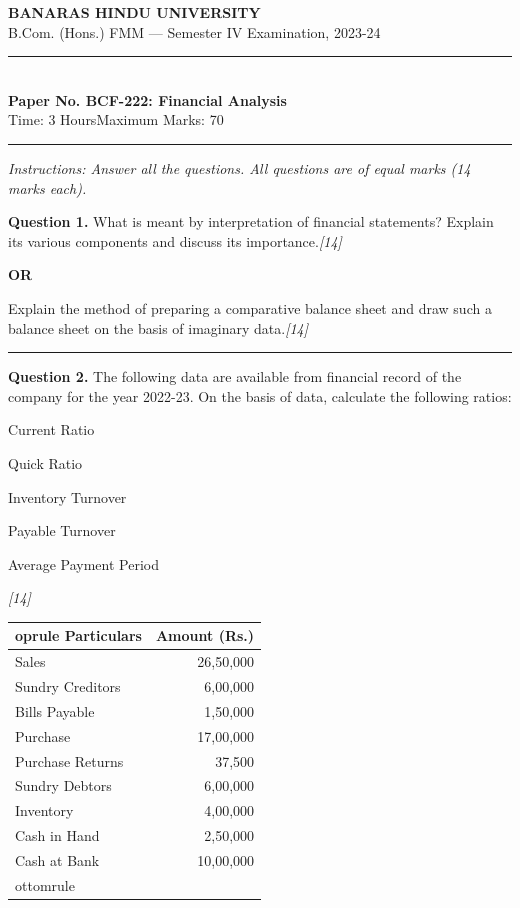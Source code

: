 \documentclass[11pt,a4paper]{article}
\newcommand{\pts}[1]{\hfill   \textit{[#1]}}
\begin{document}
\begin{center}
  {\large\bfseries BANARAS HINDU UNIVERSITY}\\[2pt]
  {\normalsize B.Com. (Hons.) FMM --- Semester IV Examination, 2023-24}\\[6pt]
  \rule{0.8\linewidth}{0.5pt}\\[6pt]
  {\large\bfseries Paper No. BCF-222: Financial Analysis}\\[4pt]
  {\normalsize Time: 3 Hours\hfill Maximum Marks: 70}
\end{center}

\rule{\linewidth}{0.4pt}

\smallskip



\noindent   \textit{Instructions: Answer all the questions. All questions are of equal marks (14 marks each).}

\bigskip




\noindent   \textbf{Question 1.}
What is meant by interpretation of financial statements? Explain its various components and discuss its importance.\pts{14}

\centerline{   \textbf{OR}}

Explain the method of preparing a comparative balance sheet and draw such a balance sheet on the basis of imaginary data.\pts{14}

\medskip\rule{\linewidth}{0.2pt}




\noindent   \textbf{Question 2.}
The following data are available from financial record of the company for the year 2022-23. On the basis of data, calculate the following ratios:

\begin{parts}
  \item Current Ratio
  \item Quick Ratio
  \item Inventory Turnover
  \item Payable Turnover
  \item Average Payment Period
\end{parts}\pts{14}


\begin{center}

\begin{tabular}{lr}
   oprule
   \textbf{Particulars} &   \textbf{Amount (Rs.)} \\
  \midrule
  Sales & 26,50,000 \\
  Sundry Creditors & 6,00,000 \\
  Bills Payable & 1,50,000 \\
  Purchase & 17,00,000 \\
  Purchase Returns & 37,500 \\
  Sundry Debtors & 6,00,000 \\
  Inventory & 4,00,000 \\
  Cash in Hand & 2,50,000 \\
  Cash at Bank & 10,00,000 \\
  ottomrule
\end{tabular}
\end{center}
\end{document}
